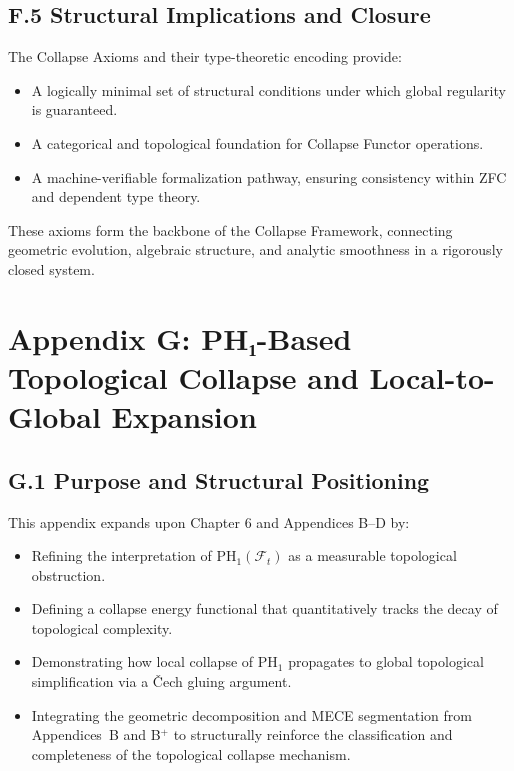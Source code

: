 \documentclass[11pt]{article}
\begin{document}
\subsection*{F.5 Structural Implications and Closure}

The Collapse Axioms and their type-theoretic encoding provide:

\begin{itemize}
  \item A logically minimal set of structural conditions under which global regularity is guaranteed.
  \item A categorical and topological foundation for Collapse Functor operations.
  \item A machine-verifiable formalization pathway, ensuring consistency within ZFC and dependent type theory.
\end{itemize}

These axioms form the backbone of the Collapse Framework, connecting geometric evolution, algebraic structure, and analytic smoothness in a rigorously closed system.



\section*{Appendix G: PH₁-Based Topological Collapse and Local-to-Global Expansion}

\subsection*{G.1 Purpose and Structural Positioning}

This appendix expands upon Chapter 6 and Appendices B–D by:

\begin{itemize}
  \item Refining the interpretation of \( \mathrm{PH}_1(\mathcal{F}_t) \) as a measurable topological obstruction.
  \item Defining a collapse energy functional that quantitatively tracks the decay of topological complexity.
  \item Demonstrating how local collapse of \( \mathrm{PH}_1 \) propagates to global topological simplification via a Čech gluing argument.
  \item Integrating the geometric decomposition and MECE segmentation from Appendices~B and B$^+$ to structurally reinforce the classification and completeness of the topological collapse mechanism.
\end{itemize}
\end{document}

